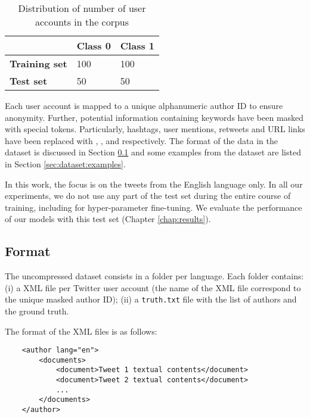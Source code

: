 \begin{table}[htbp]
\centering
\begin{tabular}{|l|l|l|}
\hline
 & \textbf{Class 0} & \textbf{Class 1} \\ \hline
\textbf{Training set} & 100 & 100 \\ \hline
\textbf{Test set} & 50 & 50 \\ \hline
\end{tabular}
\caption{Distribution of number of user accounts in the corpus}
\label{tab:dataset:corpus-distr}
\end{table}


Each user account is mapped to a unique alphanumeric author ID to ensure anonymity. Further, potential information containing keywords have been masked with special tokens. Particularly, hashtags, user mentions, retweets and URL links have been replaced with \maskHashtag{}, \maskUser{}, \maskRtOld{} and \maskUrl{} respectively. The format of the data in the dataset is discussed in Section \ref{sec:dataset:format} and some examples from the dataset are listed in Section \ref{sec:dataset:examples}. 

In this work, the focus is on the tweets from the English language only. In all our experiments, we do not use any part of the test set during the entire course of training, including for hyper-parameter fine-tuning. We evaluate the performance of our models with this test set (Chapter \ref{chap:results}).



\subsection{Format}
\label{sec:dataset:format}
The uncompressed dataset consists in a folder per language. Each folder contains: (i) a XML file per Twitter user account (the name of the XML file correspond to the unique masked author ID); (ii) a \texttt{truth.txt} file with the list of authors and the ground truth.

The format of the XML files is as follows:
\begin{verbatim}
    <author lang="en">
        <documents>
            <document>Tweet 1 textual contents</document>
            <document>Tweet 2 textual contents</document>
            ...
        </documents>
    </author>
\end{verbatim}

